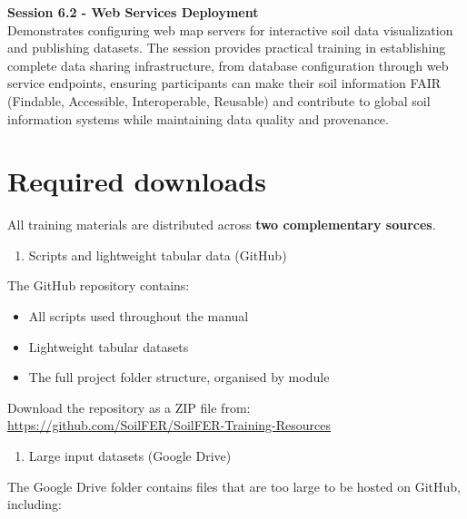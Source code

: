 \documentclass[
  10pt,
  b5paper,
  oneside]{book}
\providecommand{\tightlist}{%
  \setlength{\itemsep}{0pt}\setlength{\parskip}{0pt}}
\begin{document}
\textbf{Session 6.2 - Web Services Deployment}\\
Demonstrates configuring web map servers for interactive soil data visualization and publishing datasets. The session provides practical training in establishing complete data sharing infrastructure, from database configuration through web service endpoints, ensuring participants can make their soil information FAIR (Findable, Accessible, Interoperable, Reusable) and contribute to global soil information systems while maintaining data quality and provenance.

\section*{Required downloads}\label{required-downloads}

All training materials are distributed across \textbf{two complementary sources}.

\begin{enumerate}
\def\labelenumi{\arabic{enumi}.}
\tightlist
\item
  Scripts and lightweight tabular data (GitHub)
\end{enumerate}

The GitHub repository contains:

\begin{itemize}
\tightlist
\item
  All scripts used throughout the manual\\
\item
  Lightweight tabular datasets\\
\item
  The full project folder structure, organised by module
\end{itemize}

Download the repository as a ZIP file from:\\
\href{https://github.com/SoilFER/SoilFER-Training-Resources/archive/refs/heads/main.zip}{https://github.com/SoilFER/SoilFER-Training-Resources}

\begin{enumerate}
\def\labelenumi{\arabic{enumi}.}
\setcounter{enumi}{1}
\tightlist
\item
  Large input datasets (Google Drive)
\end{enumerate}

The Google Drive folder contains files that are too large to be hosted on GitHub, including:
\end{document}
